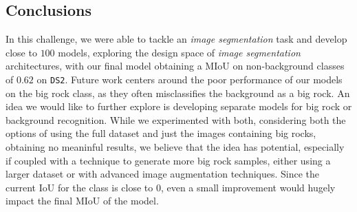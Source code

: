 \documentclass[11pt]{article}
\begin{document}
\begin{multicols}{2}
      \section{Conclusions}
      \label{sec:conclusions}

      In this challenge, we were able to tackle an \textit{image segmentation} task and develop close to $100$ models, exploring the design space of \textit{image segmentation} architectures, with our final model obtaining a MIoU on non-background classes of $0.62$ on \texttt{DS2}. Future work centers around the poor performance of our models on the big rock class, as they often misclassifies the background as a big rock. An idea we would like to further explore is developing separate models for big rock or background recognition. While we experimented with both, considering both the options of using the full dataset and just the images containing big rocks, obtaining no meaninful results, we believe that the idea has potential, especially if coupled with a technique to generate more big rock samples, either using a larger dataset or with advanced image augmentation techniques. Since the current IoU for the class is close to 0, even a small improvement would hugely impact the final MIoU of the model.

      
      

\end{multicols}
\end{document}
